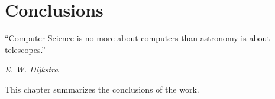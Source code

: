 \chapter{Conclusions}
\label{c:conc}

\epigraph{``Computer Science is no more about computers than astronomy is about telescopes.''}{\emph{E. W. Dijkstra}}

This chapter summarizes the conclusions of the work.
